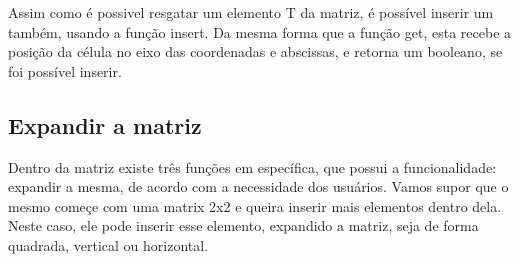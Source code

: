 \documentclass[12pt]{article}
\begin{document}
  Assim como é possivel resgatar um elemento T da matriz, é possível inserir
  um também, usando a função insert. Da mesma forma que a função get, esta 
  recebe a posição da célula no eixo das coordenadas e abscissas, e retorna
  um booleano, se foi possível inserir. 

  \subsection{Expandir a matriz}

  Dentro da matriz existe três funções em específica, que possui a funcionalidade:
  expandir a mesma, de acordo com a necessidade dos usuários. Vamos supor que o mesmo
  começe com uma matrix 2x2 e queira inserir mais elementos dentro dela. Neste
  caso, ele pode inserir esse elemento, expandido a matriz, seja de forma quadrada,
  vertical ou horizontal.
\end{document}
